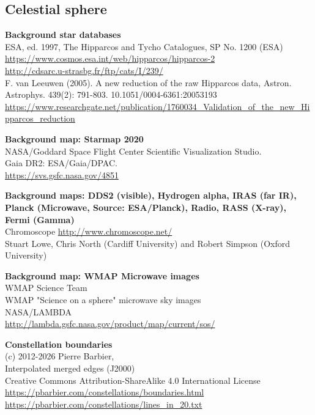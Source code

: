 \documentclass[Orbiter User Manual.tex]{subfiles}
\begin{document}
\subsection{Celestial sphere}
\textbf{Background star databases}\\
ESA, ed. 1997, The Hipparcos and Tycho Catalogues, SP No. 1200 (ESA)\\
\url{https://www.cosmos.esa.int/web/hipparcos/hipparcos-2}\\
\url{http://cdsarc.u-strasbg.fr/ftp/cats/I/239/}\\
F. van Leeuwen (2005). A new reduction of the raw Hipparcos data, Astron.
Astrophys. 439(2): 791-803. 10.1051/0004-6361:20053193\\
\url{https://www.researchgate.net/publication/1760034_Validation_of_the_new_Hipparcos_reduction}

\textbf{Background map: Starmap 2020}\\
NASA/Goddard Space Flight Center Scientific Visualization Studio.\\
Gaia DR2: ESA/Gaia/DPAC.\\
\url{https://svs.gsfc.nasa.gov/4851}

\textbf{Background maps: DDS2 (visible), Hydrogen alpha, IRAS (far IR), Planck
(Microwave, Source: ESA/Planck), Radio, RASS (X-ray), Fermi (Gamma)}\\
Chromoscope \url{http://www.chromoscope.net/}\\
Stuart Lowe, Chris North (Cardiff University) and Robert Simpson (Oxford
University)

\textbf{Background map: WMAP Microwave images}\\
WMAP Science Team\\
WMAP "Science on a sphere" microwave sky images\\
NASA/LAMBDA\\
\url{http://lambda.gsfc.nasa.gov/product/map/current/sos/}

\textbf{Constellation boundaries}\\
(c) 2012-2026 Pierre Barbier,\\
Interpolated merged edges (J2000)\\
Creative Commons Attribution-ShareAlike 4.0 International License\\
\url{https://pbarbier.com/constellations/boundaries.html}\\
\url{https://pbarbier.com/constellations/lines_in_20.txt}\\
\end{document}
